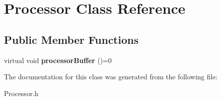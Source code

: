 \hypertarget{classProcessor}{}\section{Processor Class Reference}
\label{classProcessor}
\subsection*{Public Member Functions}
\begin{DoxyCompactItemize}
\item 
\mbox{\label{classProcessor_a9f8c30a211098721d4096fb8a16104f9}} 
virtual void {\bfseries processor\+Buffer} ()=0
\end{DoxyCompactItemize}


The documentation for this class was generated from the following file\+:\begin{DoxyCompactItemize}
\item 
Processor.\+h\end{DoxyCompactItemize}
